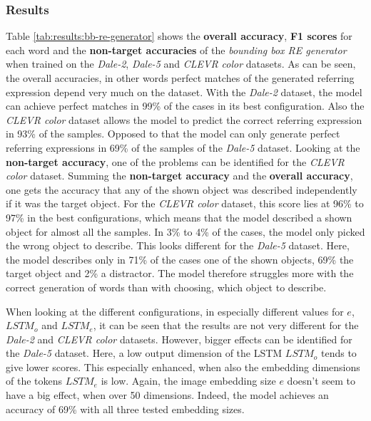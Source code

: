 \subsubsection*{Results}
Table \ref{tab:results:bb-re-generator} shows the \textbf{overall accuracy}, \textbf{F1 scores} for each word and the \textbf{non-target accuracies} of the \emph{bounding box RE generator} when trained on the \emph{Dale-2}, \emph{Dale-5} and \emph{CLEVR color} datasets.
As can be seen, the overall accuracies, in other words perfect matches of the generated referring expression depend very much on the dataset.
With the \emph{Dale-2} dataset, the model can achieve perfect matches in 99\% of the cases in its best configuration.
Also the \emph{CLEVR color} dataset allows the model to predict the correct referring expression in 93\% of the samples.
Opposed to that the model can only generate perfect referring expressions in 69\% of the samples of the \emph{Dale-5} dataset.
Looking at the \textbf{non-target accuracy}, one of the problems can be identified for the \emph{CLEVR color} dataset.
Summing the \textbf{non-target accuracy} and the \textbf{overall accuracy}, one gets the accuracy that any of the shown object was described independently if it was the target object.
For the \emph{CLEVR color} dataset, this score lies at 96\% to 97\% in the best configurations, which means that the model described a shown object for almost all the samples.
In 3\% to 4\% of the cases, the model only picked the wrong object to describe.
This looks different for the \emph{Dale-5} dataset.
Here, the model describes only in 71\% of the cases one of the shown objects, 69\% the target object and 2\% a distractor.
The model therefore struggles more with the correct generation of words than with choosing, which object to describe.

When looking at the different configurations, in especially different values for $e$, $LSTM_o$ and $LSTM_e$, it can be seen that the results are not very different for the \emph{Dale-2} and \emph{CLEVR color} datasets.
However, bigger effects can be identified for the \emph{Dale-5} dataset.
Here, a low output dimension of the LSTM $LSTM_o$ tends to give lower scores.
This especially enhanced, when also the embedding dimensions of the tokens $LSTM_e$ is low.
Again, the image embedding size $e$ doesn't seem to have a big effect, when over 50 dimensions.
Indeed, the model achieves an accuracy of 69\% with all three tested embedding sizes.

